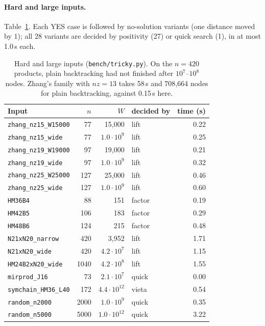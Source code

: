 \documentclass[11pt]{article}
\theoremstyle{definition}
\begin{document}
\paragraph{Hard and large inputs.} Table~\ref{tab:tricky}. Each YES case is followed by no-solution variants (one
distance moved by $1$); all 28 variants are decided by positivity (27) or quick search (1), in at most 1.0\,s each.

\begin{table}[t]
\centering\small
\begin{tabular}{@{}lrrlr@{}}
\toprule
Input & $n$ & $W$ & decided by & time (s) \\
\midrule
\texttt{zhang\_nz15\_W15000} & 77 & 15{,}000 & lift & 0.22 \\
\texttt{zhang\_nz15\_wide} & 77 & $1.0\cdot 10^{9}$ & lift & 0.25 \\
\texttt{zhang\_nz19\_W19000} & 97 & 19{,}000 & lift & 0.21 \\
\texttt{zhang\_nz19\_wide} & 97 & $1.0\cdot 10^{9}$ & lift & 0.32 \\
\texttt{zhang\_nz25\_W25000} & 127 & 25{,}000 & lift & 0.46 \\
\texttt{zhang\_nz25\_wide} & 127 & $1.0\cdot 10^{9}$ & lift & 0.60 \\
\texttt{HM36B4} & 88 & 151 & factor & 0.19 \\
\texttt{HM42B5} & 106 & 183 & factor & 0.29 \\
\texttt{HM48B6} & 124 & 215 & factor & 0.48 \\
\texttt{N21xN20\_narrow} & 420 & 3{,}952 & lift & 1.71 \\
\texttt{N21xN20\_wide} & 420 & $4.2\cdot 10^{7}$ & lift & 1.15 \\
\texttt{HM24B2xN20\_wide} & 1040 & $4.2\cdot 10^{8}$ & lift & 1.55 \\
\texttt{mirprod\_J16} & 73 & $2.1\cdot 10^{7}$ & quick & 0.00 \\
\texttt{symchain\_HM36\_L40} & 172 & $4.4\cdot 10^{12}$ & vieta & 0.54 \\
\texttt{random\_n2000} & 2000 & $1.0\cdot 10^{9}$ & quick & 0.35 \\
\texttt{random\_n5000} & 5000 & $1.0\cdot 10^{12}$ & quick & 3.22 \\
\bottomrule
\end{tabular}
\caption{Hard and large inputs (\texttt{bench/tricky.py}). On the $n=420$ products, plain backtracking had not finished
after $10^7$--$10^8$ nodes. Zhang's family with $nz=13$ takes 58\,s and 708{,}664 nodes for plain backtracking, against
0.15\,s here.}
\label{tab:tricky}
\end{table}
\end{document}
